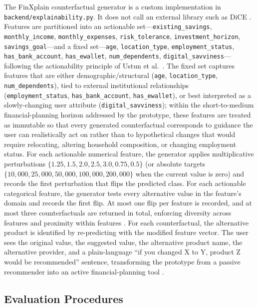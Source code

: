 \documentclass[journal]{./IEEE/IEEEtran}
\begin{document}
The FinXplain counterfactual generator is a custom implementation in \texttt{backend/explainability.py}. It does not call an external library such as DiCE \cite{ref73}. Features are partitioned into an actionable set---\texttt{existing\_savings}, \texttt{monthly\_income}, \texttt{monthly\_expenses}, \texttt{risk\_tolerance}, \texttt{investment\_horizon}, \texttt{savings\_goal}---and a fixed set---\texttt{age}, \texttt{location\_type}, \texttt{employment\_status}, \texttt{has\_bank\_account}, \texttt{has\_ewallet}, \texttt{num\_dependents}, \texttt{digital\_savviness}---following the actionability principle of Ustun et al.\ \cite{ref86}. The fixed set captures features that are either demographic/structural (\texttt{age}, \texttt{location\_type}, \texttt{num\_dependents}), tied to external institutional relationships (\texttt{employment\_status}, \texttt{has\_bank\_account}, \texttt{has\_ewallet}), or best interpreted as a slowly-changing user attribute (\texttt{digital\_savviness}); within the short-to-medium financial-planning horizon addressed by the prototype, these features are treated as immutable so that every generated counterfactual corresponds to guidance the user can realistically act on rather than to hypothetical changes that would require relocating, altering household composition, or changing employment status. For each actionable numerical feature, the generator applies multiplicative perturbations $\{1.25, 1.5, 2.0, 2.5, 3.0, 0.75, 0.5\}$ (or absolute targets $\{10{,}000, 25{,}000, 50{,}000, 100{,}000, 200{,}000\}$ when the current value is zero) and records the first perturbation that flips the predicted class. For each actionable categorical feature, the generator tests every alternative value in the feature's domain and records the first flip. At most one flip per feature is recorded, and at most three counterfactuals are returned in total, enforcing diversity across features \cite{ref73} and proximity within features \cite{ref20}. For each counterfactual, the alternative product is identified by re-predicting with the modified feature vector. The user sees the original value, the suggested value, the alternative product name, the alternative provider, and a plain-language ``if you changed X to Y, product Z would be recommended'' sentence, transforming the prototype from a passive recommender into an active financial-planning tool \cite{ref72}.

\subsection{Evaluation Procedures}
\end{document}
